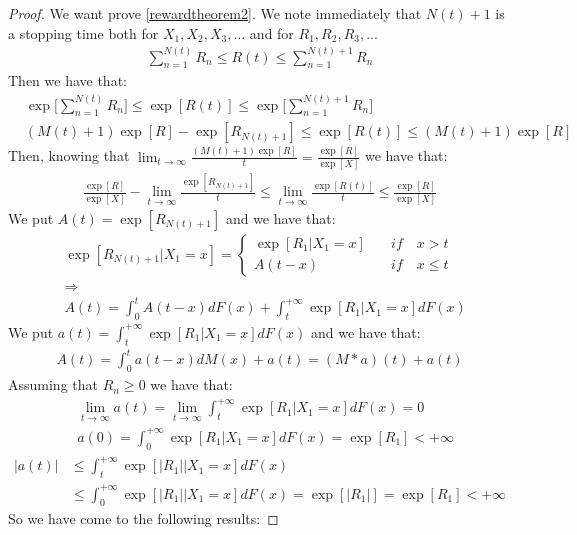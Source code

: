 \begin{proof}
	We want prove \ref{rewardtheorem2}. We note immediately that $N(t)+1$ is a stopping time both for $X_1,X_2,X_3,...$ and for $R_1,R_2,R_3,..$.
	\begin{align*}
		\sum_{n=1}^{N(t)}R_n \leq R(t) \leq \sum_{n=1}^{N(t)+1}R_n
	\end{align*}
	Then we have that:
	\begin{align*}
		& \exp\bigg[\sum_{n=1}^{N(t)}R_n\bigg] \leq \exp[R(t)] \leq \exp\bigg[\sum_{n=1}^{N(t)+1}R_n\bigg]
		\\ & (M(t)+1)\exp[R]-\exp[R_{N(t)+1}] \leq \exp[R(t)] \leq (M(t)+1)\exp[R]
	\end{align*}
	Then, knowing that $\lim_{t \to \infty} \frac{(M(t)+1)\exp[R]}{t} = \frac {\exp[R]}{\exp[X]} $ we have that:
	\begin{align*}
		\frac {\exp[R]}{\exp[X]} - \lim_{t \to \infty} \frac{\exp[R_{N(t)+1}]}{t} \leq \lim_{t \to \infty} \frac{\exp[R(t)]}{t} \leq \frac{\exp[R]}{\exp[X]}
	\end{align*}
	We put $A(t)=\exp[R_{N(t)+1}]$ and we have that:
	\begin{align*}
		& \exp[R_{N(t)+1}|X_1=x]=
			\begin{cases}
				\exp[R_1|X_1=x] \quad & if \quad x>t
				\\ A(t-x) \quad & if \quad x \leq t
			\end{cases}
		\\ & \Rightarrow
		\\ & A(t)=\int_{0}^{t}A(t-x)dF(x)+\int_{t}^{+\infty}\exp[R_1|X_1=x]dF(x)
	\end{align*}
	We put $a(t)=\int_{t}^{+\infty}\exp[R_1|X_1=x]dF(x)$ and we have that:
	\begin{align*}
		A(t)=\int_{0}^{t}a(t-x)dM(x)+a(t)=(M \ast a) (t)+a(t)
	\end{align*}
	Assuming that $R_n \geq 0$ we have that:
	\begin{align*}
		& \lim_{t \to \infty}a(t) = \lim_{t \to \infty}\int_{t}^{+\infty}\exp[R_1|X_1=x]dF(x)=0
		\\ & a(0)=\int_{0}^{+\infty}\exp[R_1|X_1=x]dF(x)=\exp[R_1]<+\infty
	\end{align*}
	\begin{align*}
		|a(t)| & \leq \int_{t}^{+\infty}\exp[|R_1||X_1=x]dF(x)
		\\ & \leq \int_{0}^{+\infty}\exp[|R_1||X_1=x]dF(x) = \exp[|R_1|]=\exp[R_1]<+\infty
	\end{align*}
	So we have come to the following results:

\end{proof}
